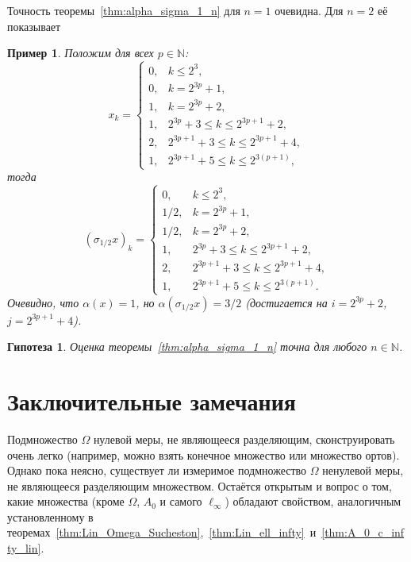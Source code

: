\documentclass[a4paper,14pt]{article} %
\theoremstyle{plain}
\newtheorem{example}[lemma]{Пример}
\newtheorem{hypothesis}[lemma]{Гипотеза}
\begin{document}
Точность теоремы~\ref{thm:alpha_sigma_1_n} для $n=1$ очевидна.
Для $n=2$ её показывает
\begin{example}
	Положим для всех $p\in\mathbb{N}$:
	\begin{equation}
		x_k=\begin{cases}
			0, & k \leq 2^3, \\
			0, & k = 2^{3p}+1, \\
			1, & k = 2^{3p}+2, \\
			1, & 2^{3p}+3 \leq k \leq 2^{3p+1}+2, \\
			2, & 2^{3p+1}+3 \leq k \leq 2^{3p+1}+4, \\
			1, & 2^{3p+1}+5 \leq k \leq 2^{3(p+1)},
		\end{cases}
	\end{equation}
	тогда
	\begin{equation}
		(\sigma_{1/2}x)_k=\begin{cases}
			0, & k \leq 2^3, \\
			1/2, & k = 2^{3p}+1, \\
			1/2, & k = 2^{3p}+2, \\
			1, & 2^{3p}+3 \leq k \leq 2^{3p+1}+2, \\
			2, & 2^{3p+1}+3 \leq k \leq 2^{3p+1}+4, \\
			1, & 2^{3p+1}+5 \leq k \leq 2^{3(p+1)}.
		\end{cases}
	\end{equation}
	Очевидно, что $\alpha(x)=1$, но $\alpha(\sigma_{1/2}x)=3/2$
	(достигается на $i=2^{3p}+2$, $j=2^{3p+1}+4$).
\end{example}

\begin{hypothesis}
	Оценка теоремы~\ref{thm:alpha_sigma_1_n} точна для любого $n\in\mathbb{N}$.
\end{hypothesis}



\section{Заключительные замечания}
Подмножество $\Omega$ нулевой меры, не являющееся разделяющим, сконструировать очень легко
(например, можно взять конечное множество или множество ортов).
Однако пока неясно, существует ли измеримое подмножество $\Omega$ ненулевой меры,
не являющееся разделяющим множеством.
Остаётся открытым и вопрос о том, какие множества (кроме $\Omega$, $A_0$ и самого $\ell_\infty$)
обладают свойством, аналогичным установленному в теоремах~\ref{thm:Lin_Omega_Sucheston},~\ref{thm:Lin_ell_infty}~и~\ref{thm:A_0_c_infty_lin}.
\end{document}
